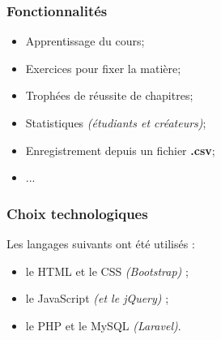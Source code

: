    \begin{frame}
    \frametitle{Fonctionnalités}
        \begin{itemize}
            \item[\textcolor{hehRouge}{\textbullet}] Apprentissage du cours;
            
            \item[\textcolor{hehRouge}{\textbullet}] Exercices pour fixer la matière;
            
            \item[\textcolor{hehRouge}{\textbullet}] Trophées de réussite de chapitres;
            
            \item[\textcolor{hehRouge}{\textbullet}] Statistiques \textit{(étudiants et créateurs)};
            
            \item[\textcolor{hehRouge}{\textbullet}] Enregistrement depuis un fichier \textbf{.csv};
            
            \item[\textcolor{hehRouge}{\textbullet}] ...
            
        \end{itemize}
    \end{frame}
    
    \begin{frame}
    \frametitle{Choix technologiques}
        Les langages suivants ont été utilisés :
        \begin{itemize}
        
            \item[\textcolor{hehRouge}{\textbullet}] le HTML et le CSS \textit{(Bootstrap)} ;%
            \item[\textcolor{hehRouge}{\textbullet}] le JavaScript \textit{(et le jQuery)} ;%
            \item[\textcolor{hehRouge}{\textbullet}] le PHP et le MySQL \textit{(Laravel)}. %
            
        \end{itemize}
        
    \end{frame}